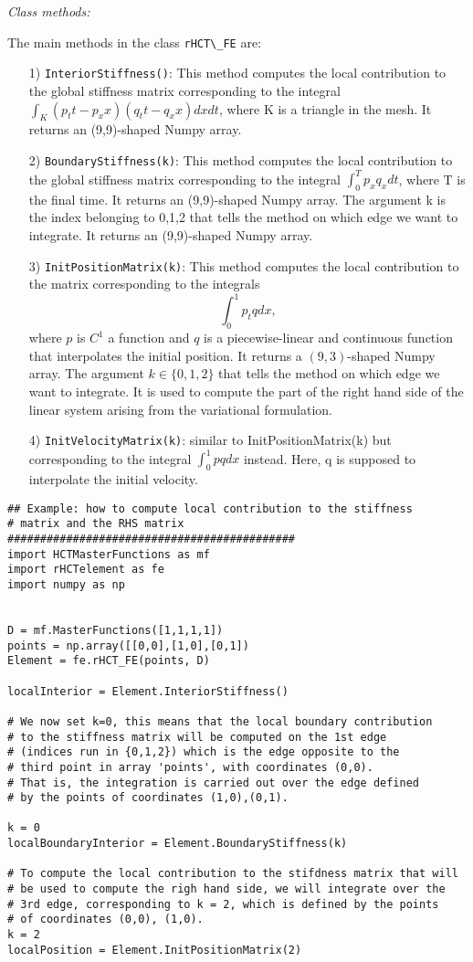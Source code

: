 \documentclass{amsart}
\theoremstyle{plain}
\theoremstyle{definition}
\theoremstyle{remark}
\numberwithin{equation}{section}
\begin{document}
\textit{Class methods:}

The main methods in the class \verb|rHCT\_FE| are:
\begin{itemize}
\item[1)] \verb|InteriorStiffness()|: This method computes the local contribution to the global stiffness
matrix corresponding to the integral
$\int_K(p_tt-p_xx)(q_tt-q_xx)dxdt$,
where K is a triangle in the mesh. It returns an (9,9)-shaped Numpy array.

\item[2)] \verb|BoundaryStiffness(k)|: This method computes the local contribution to the global stiffness
matrix corresponding to the integral
$\int_0^T p_x q_x dt$,
where T is the final time. It returns an (9,9)-shaped Numpy array. The argument k is the
index belonging to {0,1,2} that tells the method on which edge we want to integrate.
It returns an (9,9)-shaped Numpy array.

\item[3)] \verb|InitPositionMatrix(k)|: This method computes the local contribution to the matrix corresponding to the integrals
$$\int_0^1 p_t q dx,$$
where $p$ is $C^1$ a function and $q$ is a piecewise-linear and continuous function that interpolates
the initial position.
It returns a $(9,3)$-shaped Numpy array. The argument $k\in\{0,1,2\}$
that tells the method on which edge we want to integrate. It is used to compute the part
of the right hand side of the linear system arising from the variational formulation.

\item[4)] \verb|InitVelocityMatrix(k)|: similar to InitPositionMatrix(k) but corresponding to the integral
$\int_0^1 p q dx$ instead. Here, q is supposed to interpolate the initial velocity.
\end{itemize}

\begin{lstlisting}
## Example: how to compute local contribution to the stiffness
# matrix and the RHS matrix
############################################
import HCTMasterFunctions as mf
import rHCTelement as fe
import numpy as np


D = mf.MasterFunctions([1,1,1,1])
points = np.array([[0,0],[1,0],[0,1])
Element = fe.rHCT_FE(points, D)

localInterior = Element.InteriorStiffness()

# We now set k=0, this means that the local boundary contribution
# to the stiffness matrix will be computed on the 1st edge
# (indices run in {0,1,2}) which is the edge opposite to the
# third point in array 'points', with coordinates (0,0).
# That is, the integration is carried out over the edge defined
# by the points of coordinates (1,0),(0,1).

k = 0
localBoundaryInterior = Element.BoundaryStiffness(k)

# To compute the local contribution to the stifdness matrix that will
# be used to compute the righ hand side, we will integrate over the
# 3rd edge, corresponding to k = 2, which is defined by the points
# of coordinates (0,0), (1,0).
k = 2
localPosition = Element.InitPositionMatrix(2)
\end{lstlisting}
\end{document}
